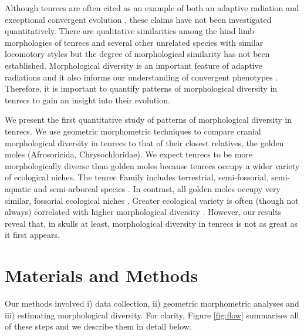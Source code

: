\documentclass[12pt,a4paper]{article}
\begin{document}
	Although tenrecs are often cited as an example of both an adaptive radiation and exceptional convergent evolution \citep{Soarimalala2011, Eisenberg1969}, these claims have not been investigated quantitatively. There are qualitative similarities among the hind limb morphologies of tenrecs and several other unrelated species with similar locomotory styles \citep{Salton2009} but the degree of morphological similarity has not been established. Morphological diversity is an important feature of adaptive radiations \citep{Losos2010a} and it also informs our understanding of convergent phenotypes \citep{Muschick2012}. Therefore, it is important to quantify patterns of morphological diversity in tenrecs to gain an insight into their evolution. 
	
	We present the first quantitative study of patterns of morphological diversity in tenrecs. We use geometric morphometric techniques \citep{Rohlf1993} to compare cranial morphological diversity in tenrecs to that of their closest relatives, the golden moles (Afrosoricida, Chrysochloridae). 
	We expect tenrecs to be more morphologically diverse than golden moles because tenrecs occupy a wider variety of ecological niches. The tenrec Family includes terrestrial, semi-fossorial, semi-aquatic and semi-arboreal species \citep{Soarimalala2011}. In contrast, all golden moles occupy very similar, fossorial ecological niches \citep{Bronner1995}. Greater ecological variety is often (though not always) correlated with higher morphological diversity \citep{Losos2010a}. However, our results reveal that, in skulls at least, morphological diversity in tenrecs is not as great as it first appears.
	
\section{Materials and Methods}

	Our methods involved i) data collection, ii) geometric morphometric analyses and iii) estimating morphological diversity. For clarity,  Figure \ref{fig:flow} summarises all of these steps and we describe them in detail below.  	
	
\end{document}
